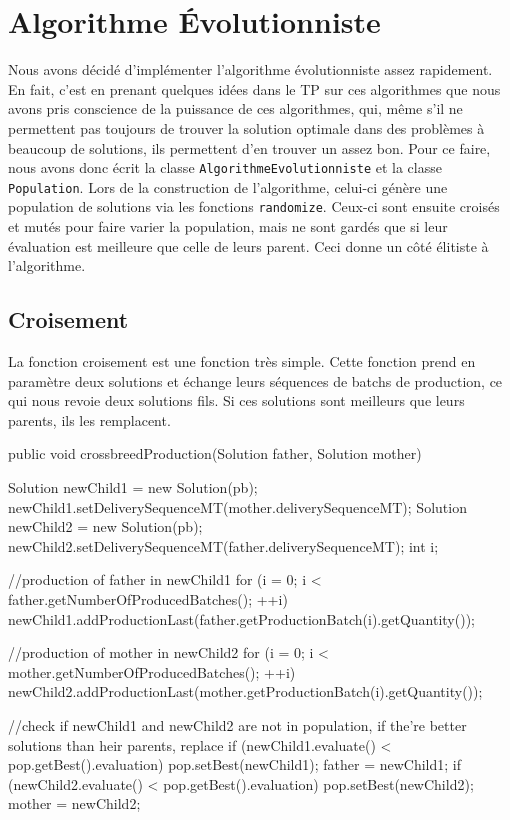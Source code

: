 \section{Algorithme Évolutionniste}
Nous avons décidé d'implémenter l'algorithme évolutionniste assez rapidement. En fait, c'est en prenant quelques idées dans le TP sur ces algorithmes que nous avons pris conscience de la puissance de ces algorithmes, qui, même s'il ne permettent pas toujours de trouver la solution optimale dans des problèmes à beaucoup de solutions, ils permettent d'en trouver un assez bon.
\vspace{1em}
Pour ce faire, nous avons donc écrit la classe \verb!AlgorithmeEvolutionniste! et la classe \verb!Population!. Lors de la construction de l'algorithme, celui-ci génère une population de solutions via les fonctions \verb!randomize!. Ceux-ci sont ensuite croisés et mutés pour faire varier la population, mais ne sont gardés que si leur évaluation est meilleure que celle de leurs parent. Ceci donne un côté élitiste à l'algorithme.

\subsection{Croisement}
La fonction croisement est une fonction très simple. Cette fonction prend en paramètre deux solutions et échange leurs séquences de batchs de production, ce qui nous revoie deux solutions fils. Si ces solutions sont meilleurs que leurs parents, ils les remplacent.

\begin{java}
public void crossbreedProduction(Solution father, Solution mother) {
	Solution newChild1 = new Solution(pb);
	newChild1.setDeliverySequenceMT(mother.deliverySequenceMT);
	Solution newChild2 = new Solution(pb);
	newChild2.setDeliverySequenceMT(father.deliverySequenceMT); 
	int i;
	
	//production of father in newChild1
	for (i = 0; i < father.getNumberOfProducedBatches(); ++i) {
		newChild1.addProductionLast(father.getProductionBatch(i).getQuantity());
	}
	
	//production of mother in newChild2
	for (i = 0; i < mother.getNumberOfProducedBatches(); ++i) {
		newChild2.addProductionLast(mother.getProductionBatch(i).getQuantity());
	}
	
	//check if newChild1 and newChild2 are not in population, if the're better solutions than 				heir parents, replace
	if (newChild1.evaluate() < pop.getBest().evaluation) {
		pop.setBest(newChild1);
		father = newChild1;
	}
	if (newChild2.evaluate() < pop.getBest().evaluation) {
		pop.setBest(newChild2);
		mother = newChild2;
	}	
}
\end{java}

